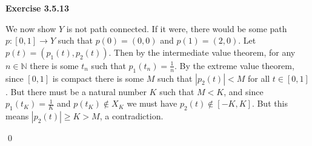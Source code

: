 \documentclass[12pt]{article}
\newcommand{\acolor}{Black}
\newcommand{\N}{\mathbb{N}}
\newcommand{\abs}[1]{\left|#1\right|}
\newenvironment{exercise}[1]
{
	{
		\Large
		\color{\acolor}
		\addtolength\leftskip{-2em}
		\textbf{Exercise #1}
		
	}
	\begin{list}{}
	{
		\setlength\leftmargin{1em}
		\setlength\rightmargin{0em}
		\setlength\labelwidth{2em}
		\setlength\itemsep{0em}
		\setlength\parsep{0.5em}
		\setlength\baselineskip{1.25em}
	}
}
{
  \qed{}
  \end{list}
}
\begin{document}
\begin{exercise}{3.5.13}
  We now show $Y$ is not path connected. If it were, there would be some path $p : [0, 1] \to Y$ such that $p(0) = (0,0)$ and $p(1) = (2,0)$. Let $p(t) = (p_1(t), p_2(t))$. Then by the intermediate value theorem, for any $n \in \N$ there is some $t_n$ such that $p_1(t_n) = \frac{1}{n}$. By the extreme value theorem, since $[0,1]$ is compact there is some $M$ such that $\abs{p_2(t)} < M$ for all $t \in [0,1]$. But there must be a natural number $K$ such that $M < K$, and since $p_1(t_K) = \frac{1}{K}$ and $p(t_K) \notin X_K$ we must have $p_2(t) \notin [-K, K]$. But this means $\abs{p_2(t)} \geq K > M$, a contradiction.
\end{exercise}
\end{document}
